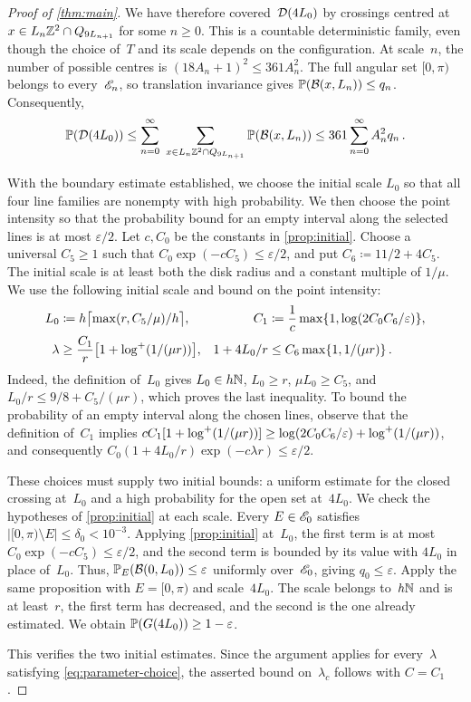 \documentclass[11pt,letterpaper]{article}
\begin{document}
\begin{proof}[Proof of \cref{thm:main}]
We have therefore covered~$\cD(4L_0)$ by crossings centred at $x\in L_n\Z^2\cap Q_{9L_{n+1}}$ for some $n\ge0$. This is a countable deterministic family, even though the choice of~$T$ and its scale depends on the configuration. At scale~$n$, the number of possible centres is $(18A_n+1)^2\le361A_n^2$. The full angular set $[0,\pi)$ belongs to every~$\cE_n$, so translation invariance gives $\P(\cB(x,L_n))\le q_n$. Consequently,
\begin{equation}\label{eq:boundary-crossing-bound}
  \P(\cD(4L_0))\le\sum_{n=0}^\infty\ \sum_{x\in L_n\Z^2\cap Q_{9L_{n+1}}}\P(\cB(x,L_n))\le361\sum_{n=0}^\infty A_n^2q_n\,.
\end{equation}

With the boundary estimate established, we choose the initial scale $L_0$ so that all four line families are nonempty with high probability. We then choose the point intensity so that the probability bound for an empty interval along the selected lines is at most $\varepsilon/2$. Let $c,C_0$ be the constants in \cref{prop:initial}. Choose a universal $C_5\ge1$ such that $C_0\exp(-cC_5)\le\varepsilon/2$, and put $C_6\coloneqq11/2+4C_5$. The initial scale is at least both the disk radius and a constant multiple of $1/\mu$. We use the following initial scale and bound on the point intensity:
\begin{align}\label{eq:parameter-choice}
  L_0&\coloneqq h\bigl\lceil\max(r,C_5/\mu)/h\bigr\rceil,&C_1&\coloneqq\frac1c\max\{1,\log(2C_0C_6/\varepsilon)\},\\
  \lambda&\ge\frac{C_1}{r}\bigl[1+\logp(1/(\mu r))\bigr],&1+4L_0/r&\le C_6\max\{1,1/(\mu r)\}\,.\notag
\end{align}
Indeed, the definition of~$L_0$ gives $L_0\in h\N$, $L_0\ge r$, $\mu L_0\ge C_5$, and $L_0/r\le9/8+C_5/(\mu r)$, which proves the last inequality. To bound the probability of an empty interval along the chosen lines, observe that the definition of~$C_1$ implies $cC_1[1+\logp(1/(\mu r))]\ge\log(2C_0C_6/\varepsilon)+\logp(1/(\mu r))$, and consequently $C_0(1+4L_0/r)\exp(-c\lambda r)\le\varepsilon/2$.

These choices must supply two initial bounds: a uniform estimate for the closed crossing at~$L_0$ and a high probability for the open set at~$4L_0$. We check the hypotheses of \cref{prop:initial} at each scale. Every $E\in\cE_0$ satisfies $\lvert[0,\pi)\setminus E\rvert\le\delta_0<10^{-3}$. Applying \cref{prop:initial} at~$L_0$, the first term is at most $C_0\exp(-cC_5)\le\varepsilon/2$, and the second term is bounded by its value with $4L_0$ in place of~$L_0$. Thus, $\P_E(\cB(0,L_0))\le\varepsilon$ uniformly over~$\cE_0$, giving $q_0\le\varepsilon$. Apply the same proposition with $E=[0,\pi)$ and scale~$4L_0$. The scale belongs to~$h\N$ and is at least~$r$, the first term has decreased, and the second is the one already estimated. We obtain $\P(G(4L_0))\ge1-\varepsilon$.

This verifies the two initial estimates. Since the argument applies for every~$\lambda$ satisfying \eqref{eq:parameter-choice}, the asserted bound on~$\lambda_c$ follows with $C=C_1$.
\end{proof}
\end{document}
